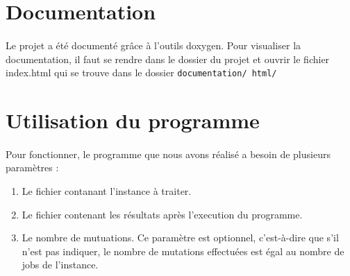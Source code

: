 	\section{Documentation}
	
	\paragraph{}
	Le projet a été documenté grâce à l'outils doxygen. Pour visualiser la documentation, il faut se rendre dans le dossier du projet et ouvrir le fichier index.html qui se trouve dans le dossier \texttt{documentation/ html/}

	\section{Utilisation du programme}
	
	\paragraph{}
	Pour fonctionner, le programme que nous avons réalisé a besoin de plusieurs paramètres :
	\begin{enumerate}
		\item Le fichier contanant l'instance à traiter.
		\item Le fichier contenant les résultats après l'execution du programme.
		\item Le nombre de mutuations. Ce paramètre est optionnel, c'est-à-dire que s'il n'est pas indiquer, le nombre de mutations effectuées est égal au nombre de jobs de l'instance.
	\end{enumerate}	
%